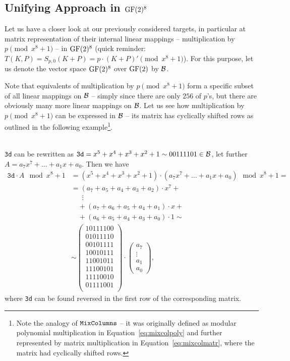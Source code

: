 \subsection{Unifying Approach in $\mathrm{GF}(2)^8$}
\label{sec:unify}

Let us have a closer look at our previously considered targets, in particular at matrix representation of their internal linear mappings -- multiplication by $p\pmod{x^8+1}$ -- in $\mathrm{GF}(2)^8$ (quick reminder: $T(K,P) = S_{p,0}(K+P) = p \cdot (K+P)' \pmod{x^8+1}$). For this purpose, let us denote the vector space $\mathrm{GF}(2)^8$ over $\mathrm{GF}(2)$ by $\cal B$.

Note that equivalents of multiplication by $p\pmod{x^8+1}$ form a specific subset of all linear mappings on $\cal B$ -- simply since there are only $256$ of $p$'s, but there are obviously many more linear mappings on $\cal B$. Let us see how multiplication by $p\pmod{x^8+1}$ can be expressed in $\cal B$ -- its matrix has cyclically shifted rows as outlined in the following example\footnote{Note the analogy of $\texttt{MixColumns}$ -- it was originally defined as modular polynomial multiplication in Equation~\ref{eq:mixcolpoly} and further represented by matrix multiplication in Equation~\ref{eq:mixcolmatr}, where the matrix had cyclically shifted rows.}.


\begin{example}
\label{ex:shiftmatrix}
	~ \\
	{\tt 3d} can be rewritten as $\texttt{3d} = x^5+x^4+x^3+x^2+1 \sim 00111101 \in\cal B$, let further $A = a_7x^7+\ldots+a_1x+a_0$. Then we have
	\begin{align*}
		\texttt{3d} \cdot A \mod{x^8+1} &= (x^5+x^4+x^3+x^2+1) \cdot (a_7x^7+\ldots+a_1x+a_0) \mod{x^8+1} = \\
		&= (a_7+a_5+a_4+a_3+a_2)\cdot x^7 + ~\\
		&\;\;\quad\vdots \\
		&\quad + (a_7+a_6+a_5+a_4+a_1)\cdot x + ~\\
		&\quad + (a_6+a_5+a_4+a_3+a_0)\cdot 1 \sim \\
		&\sim
		\begin{pmatrix}
			\boxed{10111100} \\
			01011110 \\
			00101111 \\
			10010111 \\
			11001011 \\
			11100101 \\
			11110010 \\
			01111001 \\
		\end{pmatrix}
		\cdot
		\begin{pmatrix}
			a_7 \\ \vdots \\ a_1 \\ a_0
		\end{pmatrix} ,
	\end{align*}
	where {\tt 3d} can be found reversed in the first row of the corresponding matrix.
\end{example}

